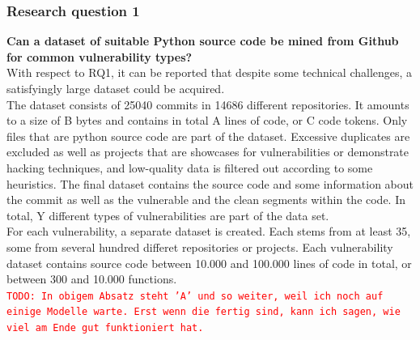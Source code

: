 \documentclass[
	a4paper,
	pagesize,
	pdftex,
	12pt,
	twoside, %
	BCOR=5mm, %
	ngerman,
	fleqn,
	final,
	]{scrartcl}
\begin{document}
\subsubsection{Research question 1}
\textbf{Can a dataset of suitable Python source code be mined from Github for common vulnerability types?}\\
With respect to RQ1, it can be reported that despite some technical challenges, a satisfyingly large dataset could be acquired.\\
The dataset consists of 25040 commits in 14686 different repositories. It amounts to a size of B bytes and contains in total A lines of code, or C code tokens. Only files that are python source code are part of the dataset. Excessive duplicates are excluded as well as projects that are showcases for vulnerabilities or demonstrate hacking techniques, and low-quality data is filtered out according to some heuristics. The final dataset contains the source code and some information about the commit as well as the vulnerable and the clean segments within the code. In total, Y different types of vulnerabilities are part of the data set.\\
For each vulnerability, a separate dataset is created. Each stems from at least 35, some from several hundred differet repositories or projects. Each vulnerability dataset contains source code between 10.000 and 100.000 lines of code in total, or between 300 and 10.000 functions.\\ %


\textcolor{red}{\texttt{TODO: In obigem Absatz steht 'A' und so weiter, weil ich noch auf einige Modelle warte. Erst wenn die fertig sind, kann ich sagen, wie viel am Ende gut funktioniert hat.}}
\end{document}
